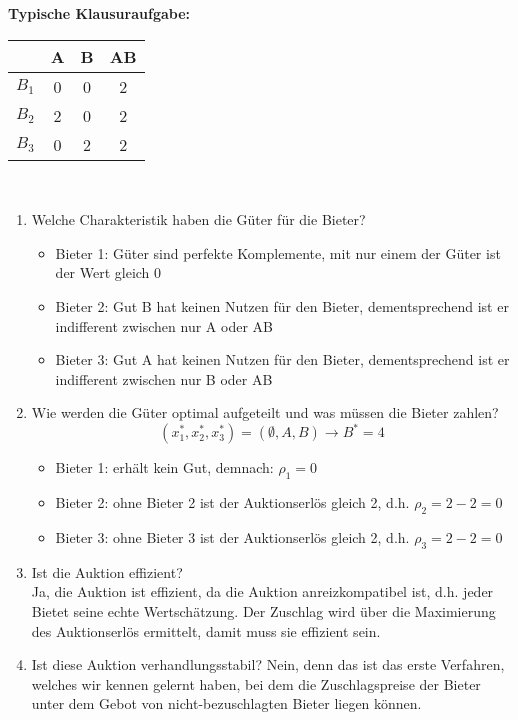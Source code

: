 \documentclass[12pt]{extreport} %
\theoremstyle{named}
\theoremstyle{itshape}
\theoremstyle{normal}
\begin{document}
\textbf{Typische Klausuraufgabe:} ~\\

\begin{figure*}[h!] \centering
	\begin{tabular}{l|ccc}
		& A & B & AB \\
  			\hline
  		$B_1$ & 0 & 0 & 2  \\
  		$B_2$ & 2 & 0 & 2  \\
  		$B_3$ & 0 & 2 & 2  
	\end{tabular}
\end{figure*}	~\\

\begin{enumerate}
	\item  Welche Charakteristik haben die Güter für die Bieter?
		\begin{itemize}
			\item Bieter 1: Güter sind perfekte Komplemente, mit nur einem der Güter ist der Wert gleich 0
			\item Bieter 2: Gut B hat keinen Nutzen für den Bieter, dementsprechend ist er indifferent zwischen nur A oder AB
			\item Bieter 3: Gut A hat keinen Nutzen für den Bieter, dementsprechend ist er indifferent zwischen nur B oder AB
		\end{itemize}
	\item Wie werden die Güter optimal aufgeteilt und was müssen die Bieter zahlen?
		$$ \left( x_1^*, x_2^*, x_3^* \right) = \left( \emptyset, A, B \right) \rightarrow B^* = 4 $$
		\begin{itemize}
			\item Bieter 1: erhält kein Gut, demnach: $\rho_1 = 0$
			\item Bieter 2: ohne Bieter 2 ist der Auktionserlös gleich 2, d.h. $\rho_2 = 2 - 2 = 0$
			\item Bieter 3: ohne Bieter 3 ist der Auktionserlös gleich 2, d.h. $\rho_3 = 2 - 2 = 0$
		\end{itemize}
	\item Ist die Auktion effizient? ~\\
		Ja, die Auktion ist effizient, da die Auktion anreizkompatibel ist, d.h. jeder Bietet seine echte Wertschätzung. Der Zuschlag wird über die Maximierung des Auktionserlös ermittelt, damit muss sie effizient sein.	
	\item Ist diese Auktion verhandlungsstabil?
		Nein, denn das ist das erste Verfahren, welches wir kennen gelernt haben, bei dem die Zuschlagspreise der Bieter unter dem Gebot von nicht-bezuschlagten Bieter liegen können.
\end{enumerate} ~\newpage
\end{document}
